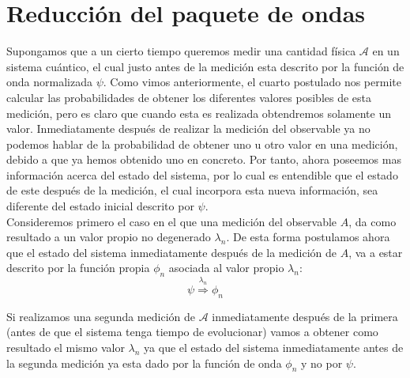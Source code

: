 \documentclass[12pt]{book}
\numberwithin{equation}{chapter}
\begin{document}
\section{Reducci\'on del paquete de ondas}
Supongamos que a un cierto tiempo queremos medir una cantidad f\'isica $\mathcal{A}$ en un sistema cu\'antico, el cual justo antes de la medici\'on esta descrito por la funci\'on de onda normalizada $\psi$. Como vimos anteriormente, el cuarto postulado nos permite calcular las probabilidades de obtener los diferentes valores posibles de esta medici\'on, pero es claro que cuando esta es realizada obtendremos solamente un valor. Inmediatamente despu\'es de realizar la medici\'on del observable ya no podemos hablar de la probabilidad de obtener uno u otro valor en una medici\'on, debido a que ya hemos obtenido uno en concreto. Por tanto, ahora poseemos mas informaci\'on acerca del estado del sistema, por lo cual es entendible que el estado de este despu\'es de la medici\'on, el cual incorpora esta nueva informaci\'on, sea diferente del estado inicial descrito por $\psi$.\\
Consideremos primero el caso en el que una medici\'on del observable $A$, da como resultado a un valor propio no degenerado $\lambda_{n}$. De esta forma postulamos ahora que el estado del sistema inmediatamente despu\'es de la medici\'on de $A$, va a estar descrito por la funci\'on propia $\phi_{n}$ asociada al valor propio $\lambda_{n}$:
$$ \psi \overset{ \lambda_{n} }{\Rightarrow} \phi_{n} $$

Si realizamos una segunda medici\'on de $\mathcal{A}$ inmediatamente despu\'es de la primera (antes de que el sistema tenga tiempo de evolucionar) vamos a obtener como resultado el mismo valor $ \lambda_{n} $ ya que el estado del sistema inmediatamente antes de la segunda medici\'on ya esta dado por la funci\'on de onda $\phi_{n}$ y no por $\psi$.
\end{document}
